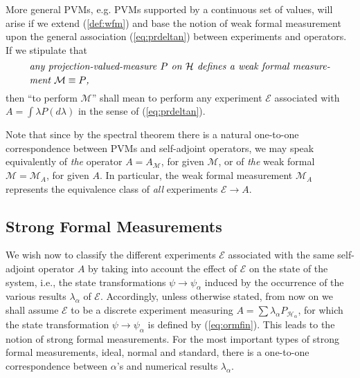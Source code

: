 \documentclass[12pt]{article}
\newcommand{\eq}[1]{(\ref{#1})}
\newcommand{\sa}{self-adjoint}
\newcommand{\PV}{projection-valued-measure}
\renewcommand{\a}{\alpha}
\newcommand{\la}{\lambda_{\a}}
\newcommand{\psia}{\psi_{\a}}
\renewcommand{\H}{\mbox{$\mathcal{H}$}}
\newcommand{\Pa}{ P_{ {\mathcal{H}_{\a} } } }
\newcommand{\E}{\mbox{$\mathscr{E}$}}
\newcommand{\M}{\mbox{$\mathcal{M}$}}
\begin{document}
More general PVMs, e.g. PVMs supported by a continuous set of values,
will arise if we extend (\ref{def:wfm}) and base the notion of weak
formal measurement upon the general association (\ref{eq:prdeltan})
between experiments and operators. If we stipulate that
\begin{equation}
\mbox{%
\begin{minipage}{0.90\textwidth}\openup 1.4\jot
   \setlength{\baselineskip}{12pt}\emph{any \PV{} $P$ on $\H$ defines a
     weak formal measurement $\M\equiv P$,}
   \end{minipage}}
\label{def:wfmg}
\end{equation}
then ``to perform $\M$'' shall mean to perform any experiment $\E$
associated with $A=\int \lambda P(d\lambda)$ in the sense of
(\ref{eq:prdeltan}).

Note that since by the spectral theorem there is a natural one-to-one
correspondence between PVMs and \sa{} operators, we may speak
equivalently of \emph{the} operator $A=A_{\mathcal{M}}$, for given
$\M$, or of \emph{the} weak formal $\M=\M_A$, for given $A$.  In
particular, the weak formal measurement $\M_{A}$ represents the
equivalence class of \emph{all} experiments $\E{}\to A$.


\subsection{Strong Formal Measurements}

We wish now to classify the different experiments \E{} associated with
the same \sa{} operator $A$ by taking into account the effect of \E{}
on the state of the system, i.e., the state transformations $\psi \to
\psia$ induced by the occurrence of the various results $\la$ of \E{}.
Accordingly, unless otherwise stated, {}from now on we shall assume
$\E$ to be a discrete experiment measuring $A=\sum\la\Pa$, for which
the state transformation $\psi \to \psia$ is defined by
\eq{eq:ormfin}.  This leads to the notion of strong formal
measurements. For the most important types of strong formal
measurements, ideal, normal and standard, there is a one-to-one
correspondence between $\a$'s and numerical results $\la$.
\end{document}
